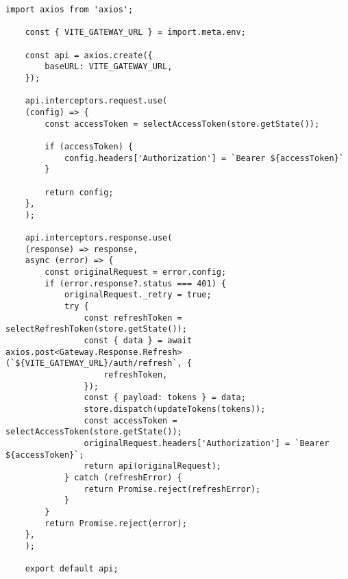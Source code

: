 \begin{lstlisting}[caption={api.ts}]
	import axios from 'axios';
	
	const { VITE_GATEWAY_URL } = import.meta.env;
	
	const api = axios.create({
		baseURL: VITE_GATEWAY_URL,
	});
	
	api.interceptors.request.use(
	(config) => {
		const accessToken = selectAccessToken(store.getState());
		
		if (accessToken) {
			config.headers['Authorization'] = `Bearer ${accessToken}`
		}
		
		return config;
	},
	);
	
	api.interceptors.response.use(
	(response) => response,
	async (error) => {
		const originalRequest = error.config;
		if (error.response?.status === 401) {
			originalRequest._retry = true;
			try {
				const refreshToken = selectRefreshToken(store.getState());
				const { data } = await axios.post<Gateway.Response.Refresh>(`${VITE_GATEWAY_URL}/auth/refresh`, {
					refreshToken,
				});
				const { payload: tokens } = data;
				store.dispatch(updateTokens(tokens));
				const accessToken = selectAccessToken(store.getState());
				originalRequest.headers['Authorization'] = `Bearer ${accessToken}`;
				return api(originalRequest);
			} catch (refreshError) {
				return Promise.reject(refreshError);
			}
		}
		return Promise.reject(error);
	},
	);
	
	export default api;
\end{lstlisting}

